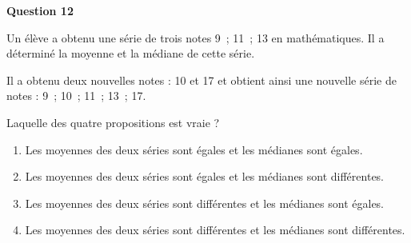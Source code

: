\textbf{Question 12}
	
	Un élève a obtenu une série de trois notes 9~; 11~; 13 en mathématiques. Il a déterminé la moyenne et la médiane de cette série.
	
	Il a obtenu deux nouvelles notes : 10 et 17 et obtient ainsi une nouvelle série de notes : 9~; 10~; 11~; 13~; 17.
	
	Laquelle des quatre propositions est vraie ?
	
	\begin{enumerate}[label=\textbf{\alph* .}]
	\item Les moyennes des deux séries sont égales et les médianes sont égales.
	\item Les moyennes des deux séries sont égales et les médianes sont différentes.
	\item Les moyennes des deux séries sont différentes et les médianes sont égales.
	\item Les moyennes des deux séries sont différentes et les médianes sont différentes.
	\end{enumerate}
